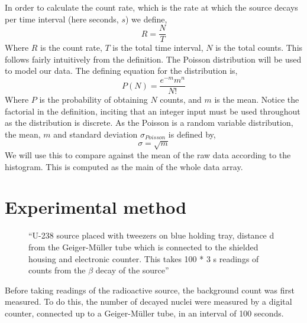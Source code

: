 \documentclass[11pt]{article}
\begin{document}
   In order to calculate the count rate, which is the rate at which the source decays per time interval (here seconds, $s$)  we define, 
   \begin{equation} R = \frac{N}{T}
   \end{equation}
   Where $R$ is the count rate, $T$ is the total time interval, $N$ is the total counts. This follows fairly intuitively from the definition. 
    The Poisson distribution will be used to model our data. The defining equation for the distribution is, 
    \begin{equation}
        P(N) = \frac{e^{-m}m^{n}}{N!}
    \end{equation}
    Where $P$ is the probability of obtaining $N$ counts, and $m$ is the mean. Notice the factorial in the definition, inciting that an integer input must be used throughout as the distribution is discrete. 
    As the Poisson is a random variable distribution, the mean, $m$ and standard deviation $\sigma_{Poisson}$ is defined by,
    \begin{equation}
        \sigma = \sqrt{m}
    \end{equation}
    We will use this to compare against the mean of the raw data according to the histogram. This is computed as the main of the whole data array. 
     \newline 
    \section{Experimental method}


    \begin{figure}[ht]
        \begin{center}
            \def\svgwidth{\columnwidth}
            
             \caption{“U-238 source placed with tweezers on blue holding tray, distance d from the Geiger-Müller tube which is connected to the shielded housing and electronic counter. This takes 100 * 3 s readings of counts from the $\beta$ decay of the source”}
             \label{fig:experimental setup}
        \end{center}
    \end{figure}

    Before taking readings of the radioactive source, the background count was first measured. To do this, the number of decayed nuclei were measured by a digital counter, connected up to a Geiger-Müller tube, in an interval of 100 seconds.
    
\end{document}
